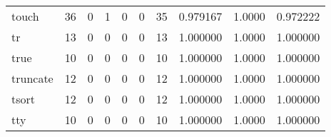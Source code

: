 \begin{tabular}{lrrrrrrrrr}
touch     &                                       36 &                                                  0 &                                                  1 &                                                  0 &                                                  0 &                                                 35 &                                           0.979167 &                                 1.0000 &                             0.972222 \\
tr        &                                       13 &                                                  0 &                                                  0 &                                                  0 &                                                  0 &                                                 13 &                                           1.000000 &                                 1.0000 &                             1.000000 \\
true      &                                       10 &                                                  0 &                                                  0 &                                                  0 &                                                  0 &                                                 10 &                                           1.000000 &                                 1.0000 &                             1.000000 \\
truncate  &                                       12 &                                                  0 &                                                  0 &                                                  0 &                                                  0 &                                                 12 &                                           1.000000 &                                 1.0000 &                             1.000000 \\
tsort     &                                       12 &                                                  0 &                                                  0 &                                                  0 &                                                  0 &                                                 12 &                                           1.000000 &                                 1.0000 &                             1.000000 \\
tty       &                                       10 &                                                  0 &                                                  0 &                                                  0 &                                                  0 &                                                 10 &                                           1.000000 &                                 1.0000 &                             1.000000 \\

\end{tabular}
